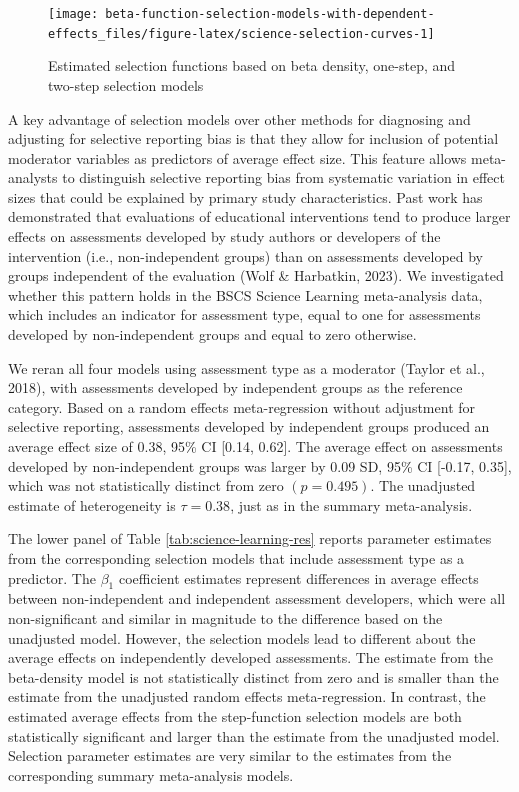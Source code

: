 \documentclass[
  american,
  man, donotrepeattitle,floatsintext]{apa7}
\begin{document}
\begin{figure}[tb]
\texttt{[image: beta-function-selection-models-with-dependent-effects\_files/figure-latex/science-selection-curves-1]} \caption{Estimated selection functions based on beta density, one-step, and two-step selection models}\label{fig:science-selection-curves}
\end{figure}

A key advantage of selection models over other methods for diagnosing and adjusting for selective reporting bias is that they allow for inclusion of potential moderator variables as predictors of average effect size. This feature allows meta-analysts to distinguish selective reporting bias from systematic variation in effect sizes that could be explained by primary study characteristics.
Past work has demonstrated that evaluations of educational interventions tend to produce larger effects on assessments developed by study authors or developers of the intervention (i.e., non-independent groups) than on assessments developed by groups independent of the evaluation (Wolf \& Harbatkin, 2023).
We investigated whether this pattern holds in the BSCS Science Learning meta-analysis data, which includes an indicator for assessment type, equal to one for assessments developed by non-independent groups and equal to zero otherwise.

We reran all four models using assessment type as a moderator (Taylor et al., 2018), with assessments developed by independent groups as the reference category.
Based on a random effects meta-regression without adjustment for selective reporting, assessments developed by independent groups produced an average effect size of 0.38, 95\% CI {[}0.14, 0.62{]}.
The average effect on assessments developed by non-independent groups was larger by 0.09 SD, 95\% CI {[}-0.17, 0.35{]}, which was not statistically distinct from zero \((p = 0.495)\).
The unadjusted estimate of heterogeneity is \(\tau = 0.38\), just as in the summary meta-analysis.

The lower panel of Table \ref{tab:science-learning-res} reports parameter estimates from the corresponding selection models that include assessment type as a predictor.
The \(\beta_1\) coefficient estimates represent differences in average effects between non-independent and independent assessment developers, which were all non-significant and similar in magnitude to the difference based on the unadjusted model.
However, the selection models lead to different about the average effects on independently developed assessments.
The estimate from the beta-density model is not statistically distinct from zero and is smaller than the estimate from the unadjusted random effects meta-regression.
In contrast, the estimated average effects from the step-function selection models are both statistically significant and larger than the estimate from the unadjusted model.
Selection parameter estimates are very similar to the estimates from the corresponding summary meta-analysis models.
\end{document}
